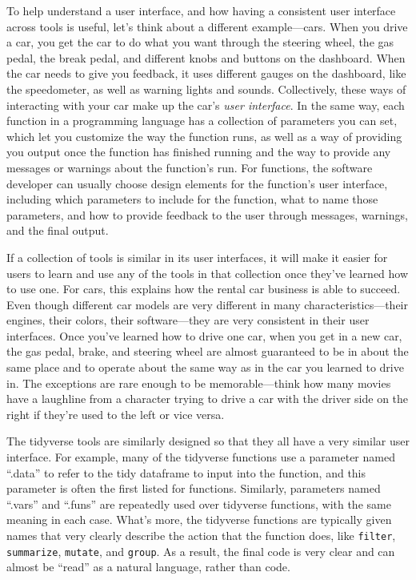 \documentclass[]{tufte-book}
\begin{document}
To help understand a user interface, and how having a consistent user interface
across tools is useful, let's think about a different example---cars. When you
drive a car, you get the car to do what you want through the steering wheel, the
gas pedal, the break pedal, and different knobs and buttons on the dashboard.
When the car needs to give you feedback, it uses different gauges on the
dashboard, like the speedometer, as well as warning lights and sounds.
Collectively, these ways of interacting with your car make up the car's \emph{user
interface}. In the same way, each function in a programming language has a
collection of parameters you can set, which let you customize the way the
function runs, as well as a way of providing you output once the function has
finished running and the way to provide any messages or warnings about the
function's run. For functions, the software developer can usually choose design
elements for the function's user interface, including which parameters to
include for the function, what to name those parameters, and how to provide
feedback to the user through messages, warnings, and the final output.

If a collection of tools is similar in its user interfaces, it will make it
easier for users to learn and use any of the tools in that collection once
they've learned how to use one. For cars, this explains how the rental car
business is able to succeed. Even though different car models are very different
in many characteristics---their engines, their colors, their software---they are
very consistent in their user interfaces. Once you've learned how to drive one
car, when you get in a new car, the gas pedal, brake, and steering wheel are
almost guaranteed to be in about the same place and to operate about the same
way as in the car you learned to drive in. The exceptions are rare enough to be
memorable---think how many movies have a laughline from a character trying to
drive a car with the driver side on the right if they're used to the left or
vice versa.

The tidyverse tools are similarly designed so that they all have a very similar
user interface. For example, many of the tidyverse functions use a parameter
named ``.data'' to refer to the tidy dataframe to input into the function, and
this parameter is often the first listed for functions. Similarly, parameters
named ``.vars'' and ``.funs'' are repeatedly used over tidyverse functions, with the
same meaning in each case. What's more, the tidyverse functions are typically given names
that very clearly describe the action that the function does, like \texttt{filter},
\texttt{summarize}, \texttt{mutate}, and \texttt{group}. As a result, the final code is very clear
and can almost be ``read'' as a natural language, rather than code.
\end{document}
